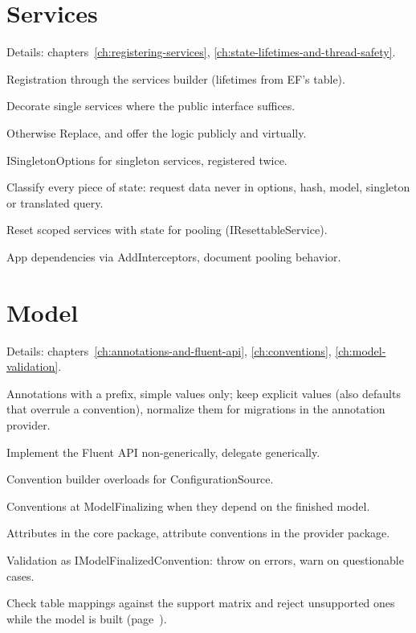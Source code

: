 \section{Services}

\noindent Details: chapters~\ref{ch:registering-services}, \ref{ch:state-lifetimes-and-thread-safety}.

\begin{checklist}
  \item Registration through the services builder (lifetimes from EF's table).
  \item Decorate single services where the public interface suffices.
  \item Otherwise Replace, and offer the logic publicly and virtually.
  \item ISingletonOptions for singleton services, registered twice.
  \item Classify every piece of state: request data never
    in options, hash, model, singleton or translated query.
  \item Reset scoped services with state for pooling (IResettableService).
  \item App dependencies via AddInterceptors, document pooling behavior.
\end{checklist}

\section{Model}

\noindent Details: chapters~\ref{ch:annotations-and-fluent-api}, \ref{ch:conventions}, \ref{ch:model-validation}.

\begin{checklist}
  \item Annotations with a prefix, simple values only; keep explicit values (also defaults that
    overrule a convention), normalize them for migrations in the annotation provider.
  \item Implement the Fluent API non-generically, delegate generically.
  \item Convention builder overloads for ConfigurationSource.
  \item Conventions at ModelFinalizing when they depend on the finished model.
  \item Attributes in the core package, attribute conventions in the provider package.
  \item Validation as IModelFinalizedConvention: throw on errors, warn on questionable
    cases.
  \item Check table mappings against the support matrix and reject unsupported ones while the
    model is built (page~\pageref{sec:supported-table-mappings}).
\end{checklist}

